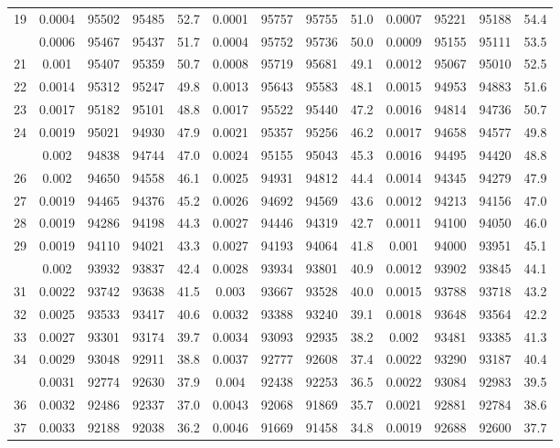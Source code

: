 \documentclass[
  14pt,
]{article}
\begin{document}
\begin{longtable}[t]{lcccccccccccc}
19 & 0.0004 & 95502 & 95485 & 52.7 & 0.0001 & 95757 & 95755 & 51.0 & 0.0007 & 95221 & 95188 & 54.4\\
\addlinespace
20 & 0.0006 & 95467 & 95437 & 51.7 & 0.0004 & 95752 & 95736 & 50.0 & 0.0009 & 95155 & 95111 & 53.5\\
21 & 0.001 & 95407 & 95359 & 50.7 & 0.0008 & 95719 & 95681 & 49.1 & 0.0012 & 95067 & 95010 & 52.5\\
22 & 0.0014 & 95312 & 95247 & 49.8 & 0.0013 & 95643 & 95583 & 48.1 & 0.0015 & 94953 & 94883 & 51.6\\
23 & 0.0017 & 95182 & 95101 & 48.8 & 0.0017 & 95522 & 95440 & 47.2 & 0.0016 & 94814 & 94736 & 50.7\\
24 & 0.0019 & 95021 & 94930 & 47.9 & 0.0021 & 95357 & 95256 & 46.2 & 0.0017 & 94658 & 94577 & 49.8\\
\addlinespace
25 & 0.002 & 94838 & 94744 & 47.0 & 0.0024 & 95155 & 95043 & 45.3 & 0.0016 & 94495 & 94420 & 48.8\\
26 & 0.002 & 94650 & 94558 & 46.1 & 0.0025 & 94931 & 94812 & 44.4 & 0.0014 & 94345 & 94279 & 47.9\\
27 & 0.0019 & 94465 & 94376 & 45.2 & 0.0026 & 94692 & 94569 & 43.6 & 0.0012 & 94213 & 94156 & 47.0\\
28 & 0.0019 & 94286 & 94198 & 44.3 & 0.0027 & 94446 & 94319 & 42.7 & 0.0011 & 94100 & 94050 & 46.0\\
29 & 0.0019 & 94110 & 94021 & 43.3 & 0.0027 & 94193 & 94064 & 41.8 & 0.001 & 94000 & 93951 & 45.1\\
\addlinespace
30 & 0.002 & 93932 & 93837 & 42.4 & 0.0028 & 93934 & 93801 & 40.9 & 0.0012 & 93902 & 93845 & 44.1\\
31 & 0.0022 & 93742 & 93638 & 41.5 & 0.003 & 93667 & 93528 & 40.0 & 0.0015 & 93788 & 93718 & 43.2\\
32 & 0.0025 & 93533 & 93417 & 40.6 & 0.0032 & 93388 & 93240 & 39.1 & 0.0018 & 93648 & 93564 & 42.2\\
33 & 0.0027 & 93301 & 93174 & 39.7 & 0.0034 & 93093 & 92935 & 38.2 & 0.002 & 93481 & 93385 & 41.3\\
34 & 0.0029 & 93048 & 92911 & 38.8 & 0.0037 & 92777 & 92608 & 37.4 & 0.0022 & 93290 & 93187 & 40.4\\
\addlinespace
35 & 0.0031 & 92774 & 92630 & 37.9 & 0.004 & 92438 & 92253 & 36.5 & 0.0022 & 93084 & 92983 & 39.5\\
36 & 0.0032 & 92486 & 92337 & 37.0 & 0.0043 & 92068 & 91869 & 35.7 & 0.0021 & 92881 & 92784 & 38.6\\
37 & 0.0033 & 92188 & 92038 & 36.2 & 0.0046 & 91669 & 91458 & 34.8 & 0.0019 & 92688 & 92600 & 37.7\\

\end{longtable}
\end{document}
